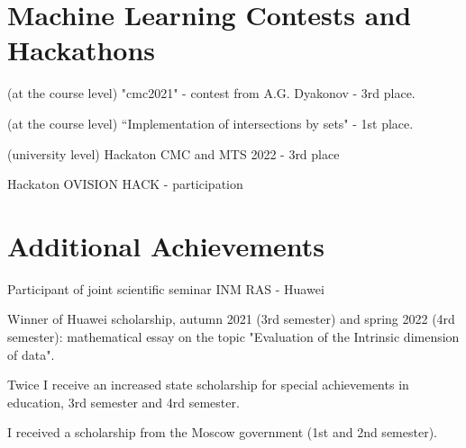 \documentclass[a4paper,20pt]{article}
\begin{document}
\section{Machine Learning Contests and Hackathons}
\begin{description}[font=$\bullet$]
\item (at the course level) "cmc2021" - contest from A.G. Dyakonov - 3rd place.
\item (at the course level) “Implementation of intersections by sets" - 1st place. 
\item (university level) Hackaton CMC and MTS 2022 - 3rd place
\item Hackaton OVISION HACK - participation

\end{description}
\vspace{-5pt}

\section{Additional Achievements}
\begin{description}[font=$\bullet$]
\item Participant of joint scientific seminar INM RAS - Huawei
\item Winner of Huawei scholarship, autumn 2021 (3rd semester) and spring 2022 (4rd semester): mathematical essay on the topic "Evaluation of the Intrinsic dimension of data".
\item Twice I receive an increased state scholarship for special achievements in education, 3rd semester and 4rd semester. 
\item I received a scholarship from the Moscow government (1st and 2nd semester).
\vspace{-5pt}

\end{description}
\end{document}
